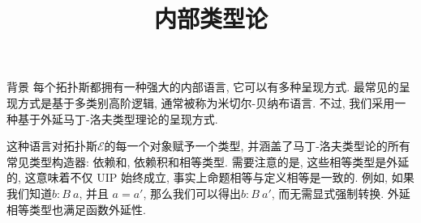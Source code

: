 \documentclass[aspectratio=169,xcolor=dvipsnames]{beamer}
\title{内部类型论}
\date{}
\newcommand\calE{\mathcal{E}}
\begin{document}
\begin{frame}
    \titlepage
\end{frame}

\begin{frame}{背景}
  每个拓扑斯都拥有一种强大的内部语言, 它可以有多种呈现方式. 最常见的呈现方式是基于多类别高阶逻辑, 通常被称为米切尔-贝纳布语言. 不过, 我们采用一种基于外延马丁-洛夫类型理论的呈现方式.

  \bigskip

  这种语言对拓扑斯$\calE$的每一个对象赋予一个类型, 并涵盖了马丁-洛夫类型论的所有常见类型构造器: 依赖和, 依赖积和相等类型. 需要注意的是, 这些相等类型是外延的, 这意味着不仅 UIP 始终成立, 事实上命题相等与定义相等是一致的. 例如, 如果我们知道$b : B\:a$, 并且 $a=a'$, 那么我们可以得出$b:B\:a'$, 而无需显式强制转换. 外延相等类型也满足函数外延性.
\end{frame}
\end{document}
